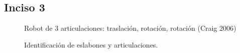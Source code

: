 \documentclass[a4paper,12pt]{article}
\begin{document}
\subsection{Inciso 3}
\label{subsec: robot 3}

\begin{figure}[H]
    \centering
    \begin{adjustbox}{scale = 0.7, max width=\columnwidth}
    \end{adjustbox}
    \caption{Robot de 3 articulaciones: traslación, rotación, rotación (Craig 2006)}
\end{figure}

\begin{figure}[H]
    \centering
    \begin{adjustbox}{scale = 0.7, max width=\columnwidth}
    \end{adjustbox}
    \caption{Identificación de eslabones y articulaciones.}
\end{figure}
\end{document}
